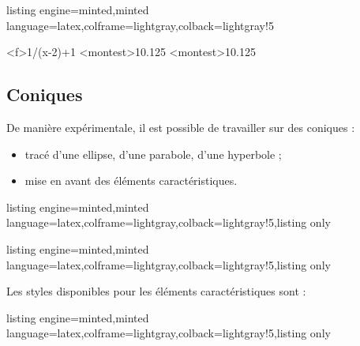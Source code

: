 \documentclass[11pt,a4paper]{ltxdoc}
\begin{document}
\begin{tcblisting}{listing engine=minted,minted language=latex,colframe=lightgray,colback=lightgray!5}
\begin{GraphiqueTikz}[x=0.5cm,Xmin=-10,Xmax=20,Xgrille=2,Xgrilles=1]
  \DefinirCourbe[ValeursInterdites={2},Nom=montest,Trace,Couleur=red]<f>{1/(x-2)+1}
  \AfficherVoisinage[Entree=auto,TypeLimite={L en +inf},DebutX=2]<montest>{1}{0.125}
  \AfficherVoisinage[Entree=auto,TypeLimite={L en -inf},FinX=2]<montest>{1}{0.125}
\end{GraphiqueTikz}
\end{tcblisting}

\pagebreak

\subsection{Coniques}\label{coniques}

De manière expérimentale, il est possible de travailler sur des coniques :

\begin{itemize}
  \item tracé d'une ellipse, d'une parabole, d'une hyperbole ;
  \item mise en avant des éléments caractéristiques.
\end{itemize}

\begin{tcblisting}{listing engine=minted,minted language=latex,colframe=lightgray,colback=lightgray!5,listing only}

\end{tcblisting}

\begin{tcblisting}{listing engine=minted,minted language=latex,colframe=lightgray,colback=lightgray!5,listing only}
\end{tcblisting}

Les styles disponibles pour les éléments caractéristiques sont :

\begin{tcblisting}{listing engine=minted,minted language=latex,colframe=lightgray,colback=lightgray!5,listing only}
\end{tcblisting}
\end{document}
